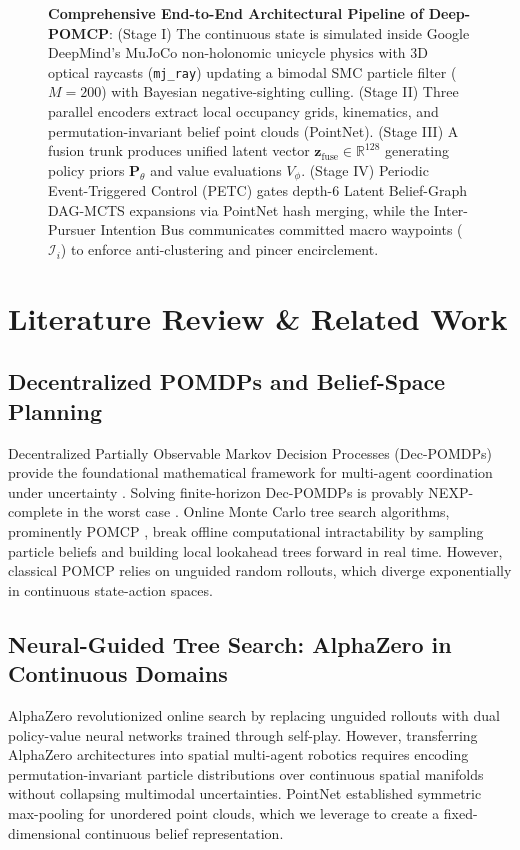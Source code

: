 \documentclass[conference]{IEEEtran}
\begin{document}
\begin{figure}[!t]
{\begin{tikzpicture}
\end{tikzpicture}%
}
\caption{\textbf{Comprehensive End-to-End Architectural Pipeline of Deep-POMCP}: (Stage I) The continuous state is simulated inside Google DeepMind's MuJoCo non-holonomic unicycle physics with 3D optical raycasts (\texttt{mj\_ray}) updating a bimodal SMC particle filter ($M=200$) with Bayesian negative-sighting culling. (Stage II) Three parallel encoders extract local occupancy grids, kinematics, and permutation-invariant belief point clouds (PointNet). (Stage III) A fusion trunk produces unified latent vector $\mathbf{z}_{\text{fuse}} \in \mathbb{R}^{128}$ generating policy priors $\mathbf{P}_\theta$ and value evaluations $V_\phi$. (Stage IV) Periodic Event-Triggered Control (PETC) gates depth-6 Latent Belief-Graph DAG-MCTS expansions via PointNet hash merging, while the Inter-Pursuer Intention Bus communicates committed macro waypoints ($\mathcal{I}_i$) to enforce anti-clustering and pincer encirclement.}
\label{fig:architecture}
\end{figure}

\section{Literature Review \& Related Work}
\subsection{Decentralized POMDPs and Belief-Space Planning}
Decentralized Partially Observable Markov Decision Processes (Dec-POMDPs) provide the foundational mathematical framework for multi-agent coordination under uncertainty \cite{bernstein2002complexity}. Solving finite-horizon Dec-POMDPs is provably NEXP-complete in the worst case \cite{bernstein2002complexity}. Online Monte Carlo tree search algorithms, prominently POMCP \cite{silver2010monte}, break offline computational intractability by sampling particle beliefs and building local lookahead trees forward in real time. However, classical POMCP relies on unguided random rollouts, which diverge exponentially in continuous state-action spaces.

\subsection{Neural-Guided Tree Search: AlphaZero in Continuous Domains}
AlphaZero \cite{silver2017mastering} revolutionized online search by replacing unguided rollouts with dual policy-value neural networks trained through self-play. However, transferring AlphaZero architectures into spatial multi-agent robotics requires encoding permutation-invariant particle distributions over continuous spatial manifolds without collapsing multimodal uncertainties. PointNet \cite{qi2017pointnet} established symmetric max-pooling for unordered point clouds, which we leverage to create a fixed-dimensional continuous belief representation.
\end{document}
